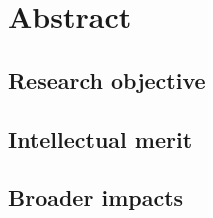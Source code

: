 \section[Abstract]{Abstract}

\subsection{Research objective}

\subsection{Intellectual merit}

\subsection{Broader impacts}